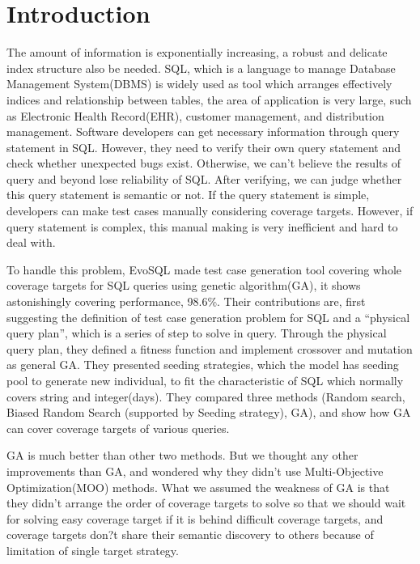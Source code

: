 \chapter{Introduction}

The amount of information is exponentially increasing, a robust and delicate index structure also be needed. SQL, which is a language to manage Database Management System(DBMS) is widely used as tool which arranges effectively indices and relationship between tables, the area of application is very large, such as Electronic Health Record(EHR), customer management, and distribution management. Software developers can get necessary information through query statement in SQL. However, they need to verify their own query statement and check whether unexpected bugs exist. Otherwise, we can't believe the results of query and beyond lose reliability of SQL. After verifying, we can judge whether this query statement is semantic or not. If the query statement is simple, developers can make test cases manually considering coverage targets. However, if query statement is complex, this manual making is very inefficient and hard to deal with.

To handle this problem, EvoSQL made test case generation tool covering whole coverage targets for SQL queries using genetic algorithm(GA), it shows astonishingly covering performance, 98.6\%. Their contributions are, first suggesting the definition of test case generation problem for SQL and a ``physical query plan'', which is a series of step to solve in query. Through the physical query plan, they defined a fitness function and implement crossover and mutation as general GA. They presented seeding strategies, which the model has seeding pool to generate new individual, to fit the characteristic of SQL which normally covers string and integer(days). They compared three methods (Random search, Biased Random Search (supported by Seeding strategy), GA), and show how GA can cover coverage targets of various queries.
 

GA is much better than other two methods. But we thought any other improvements than GA, and wondered why they didn't use Multi-Objective Optimization(MOO) methods. What we assumed the weakness of GA is that they didn't arrange the order of coverage targets to solve so that we should wait for solving easy coverage target if it is behind difficult coverage targets, and coverage targets don?t share their semantic discovery to others because of limitation of single target strategy.
 

